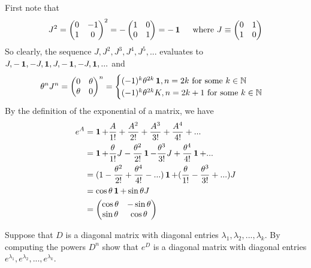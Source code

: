 \documentclass[11pt,onecolumn]{article}
\begin{document}
\begin{answer}
First note that 
$$ J^2 = \begin{pmatrix} 0 & -1 \\ 1 & 0  \end{pmatrix}^2 = - \begin{pmatrix} 1 & 0 \\ 0 & 1 \end{pmatrix} = -\operatorname{\mathbf{1}} \quad \text{ where } J \equiv \begin{pmatrix} 0 & 1 \\ 1 & 0 \end{pmatrix} $$
So clearly, the sequence $J,J^2,J^3,J^4,J^5,...$ evaluates to $J, -\operatorname{\mathbf{1}}, -J, \operatorname{\mathbf{1}}, J, -\operatorname{\mathbf{1}}, -J, \operatorname{\mathbf{1}},...$ and $$ \theta^n J^n = \begin{pmatrix} 0 & \theta \\ \theta & 0 \end{pmatrix}^n = \begin{cases} (-1)^k\theta^{2k} \operatorname{\mathbf{1}}, n = 2k \text{ for some } k\in \mathbb{N} \\ (-1)^k\theta^{2k} K, n=2k+1 \text{ for some } k \in \mathbb{N}
\end{cases}$$
By the definition of the exponential of a matrix, we have
\begin{align*}
    e^A &= \operatorname{\mathbf{1}} + \frac{A}{1!} + \frac{A^2}{2!} + \frac{A^3}{3!} + \frac{A^4}{4!} + ... \\
    &= \operatorname{\mathbf{1}} + \frac{\theta}{1!}J -  \frac{\theta^2}{2!}\operatorname{\mathbf{1}} - \frac{\theta^3}{3!}J + \frac{\theta^4}{4!} \operatorname{\mathbf{1}} + ...\\
    &= (1 - \frac{\theta^2}{2!} + \frac{\theta^4}{4!} - ...)\operatorname{\mathbf{1}} + (\frac{\theta}{1!} - \frac{\theta^3}{3!} + ...)J \\
    &= \cos{\theta} \operatorname{\mathbf{1}} + \sin{\theta} J \\
    &= \begin{pmatrix} \cos{\theta} & -\sin{\theta} \\ \sin{\theta} & \cos{\theta} \end{pmatrix}
\end{align*}
\end{answer}
\begin{exercise}
 Suppose that $D$ is a diagonal matrix with diagonal entries
$\lambda_1,\lambda_2,..., \lambda_k$. By computing the powers $D^n$ show that $e^D$ is a diagonal matrix with diagonal entries $e^{\lambda_1},e^{\lambda_2},...,e^{\lambda_k}$.
\end{exercise}
\end{document}
